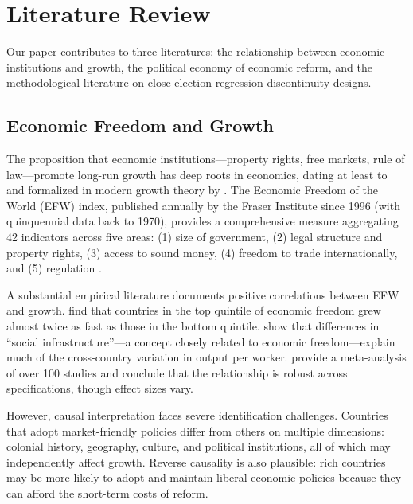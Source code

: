 \documentclass[12pt,a4paper]{article}
\begin{document}
\section{Literature Review}
\label{sec:literature}

Our paper contributes to three literatures: the relationship between 
economic institutions and growth, the political economy of economic reform, 
and the methodological literature on close-election regression discontinuity 
designs.

\subsection{Economic Freedom and Growth}

The proposition that economic institutions---property rights, free markets, 
rule of law---promote long-run growth has deep roots in economics, dating 
at least to \citet{north1990institutions} and formalized in modern growth 
theory by \citet{acemoglu2005institutions}. The Economic Freedom of the 
World (EFW) index, published annually by the Fraser Institute since 1996 
(with quinquennial data back to 1970), provides a comprehensive measure 
aggregating 42 indicators across five areas: (1) size of government, 
(2) legal structure and property rights, (3) access to sound money, 
(4) freedom to trade internationally, and (5) regulation 
\citep{gwartney2023economic}.

A substantial empirical literature documents positive correlations between 
EFW and growth. \citet{gwartney2004economic} find that countries in the 
top quintile of economic freedom grew almost twice as fast as those in 
the bottom quintile. \citet{hall1999why} show that differences in 
``social infrastructure''---a concept closely related to economic 
freedom---explain much of the cross-country variation in output per 
worker. \citet{murphy2019economic} provide a meta-analysis of over 100 
studies and conclude that the relationship is robust across specifications, 
though effect sizes vary.

However, causal interpretation faces severe identification challenges. 
Countries that adopt market-friendly policies differ from others on 
multiple dimensions: colonial history, geography, culture, and political 
institutions, all of which may independently affect growth. Reverse 
causality is also plausible: rich countries may be more likely to adopt 
and maintain liberal economic policies because they can afford the 
short-term costs of reform.
\end{document}
